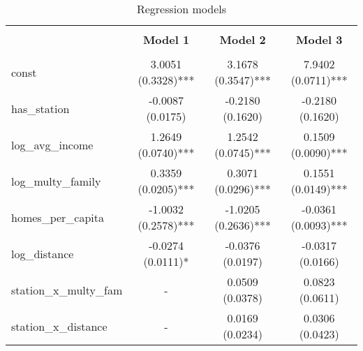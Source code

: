 
    \begin{table}
        \centering
        \caption{Regression models}
        \vspace{10pt}
        \label{tab:regression_models}
        \begin{tabular}{lccc}
        \hline
        \hline \\[-1.8ex]
     & \textbf{Model 1} & \textbf{Model 2} & \textbf{Model 3} \\
\hline \\[-1.8ex] 
const & 3.0051 (0.3328)*** & 3.1678 (0.3547)*** & 7.9402 (0.0711)*** \\
has\_station & -0.0087 (0.0175) & -0.2180 (0.1620) & -0.2180 (0.1620) \\
log\_avg\_income & 1.2649 (0.0740)*** & 1.2542 (0.0745)*** & 0.1509 (0.0090)*** \\
log\_multy\_family & 0.3359 (0.0205)*** & 0.3071 (0.0296)*** & 0.1551 (0.0149)*** \\
homes\_per\_capita & -1.0032 (0.2578)*** & -1.0205 (0.2636)*** & -0.0361 (0.0093)*** \\
log\_distance & -0.0274 (0.0111)* & -0.0376 (0.0197) & -0.0317 (0.0166) \\
station\_x\_multy\_fam & - & 0.0509 (0.0378) & 0.0823 (0.0611) \\
station\_x\_distance & - & 0.0169 (0.0234) & 0.0306 (0.0423) \\

        \hline
        \hline
        \end{tabular}
    \end{table}
    